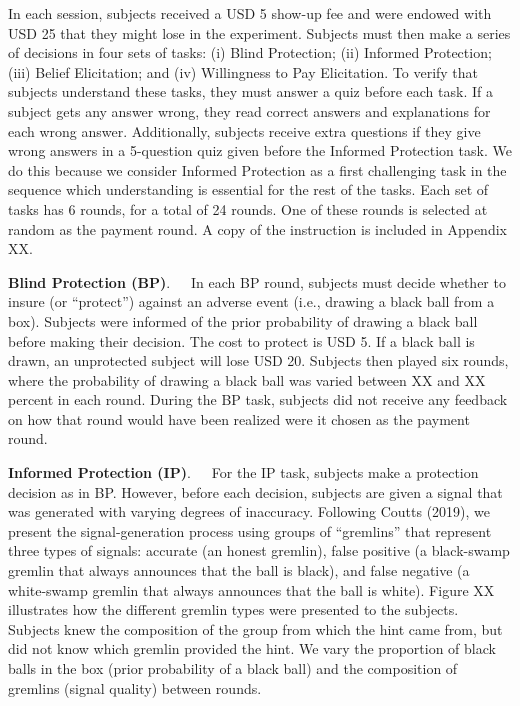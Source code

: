 \documentclass[12pt,a4paper]{article}
\begin{document}
In each session, subjects received a USD 5 show-up fee and were endowed with USD 25 that they might lose in the experiment. Subjects must then make a series of decisions in four sets of tasks: (i) Blind Protection; (ii) Informed Protection; (iii) Belief Elicitation; and (iv) Willingness to Pay Elicitation. To verify that subjects understand these tasks, they must answer a quiz before each task. If a subject gets any answer wrong, they read correct answers and explanations for each wrong answer. Additionally, subjects receive extra questions if they give wrong answers in a 5-question quiz given before the Informed Protection task. We do this because we consider Informed Protection as a first challenging task in the sequence which understanding is essential for the rest of the tasks. 
Each set of tasks has 6 rounds, for a total of 24 rounds. One of these rounds is selected at random as the payment round. A copy of the instruction is included in Appendix XX.

\bigskip
\noindent\textbf{Blind Protection (BP)}.\ \ \ In each BP round, subjects must decide whether to insure (or “protect”) against an adverse event (i.e., drawing a black ball from a box).  Subjects were informed of the prior probability of drawing a black ball before making their decision. The cost to protect is USD 5. If a black ball is drawn, an unprotected subject will lose USD 20. Subjects then played six rounds, where the probability of drawing a black ball was varied between XX and XX percent in each round. During the BP task, subjects did not receive any feedback on how that round would have been realized were it chosen as the payment round.

\bigskip
\noindent\textbf{Informed Protection (IP)}.\ \ \ For the IP task, subjects make a protection decision as in BP. However, before each decision, subjects are given a signal that was generated with varying degrees of inaccuracy. Following Coutts (2019), we present the signal-generation process using groups of ``gremlins'' that represent three types of signals: accurate (an honest gremlin), false positive (a black-swamp gremlin that always announces that the ball is black), and false negative (a white-swamp gremlin that always announces that the ball is white). Figure XX illustrates how the different gremlin types were presented to the subjects. Subjects knew the composition of the group from which the hint came from, but did not know which gremlin provided the hint. We vary the proportion of black balls in the box (prior probability of a black ball) and the composition of gremlins (signal quality) between rounds.  
\end{document}
